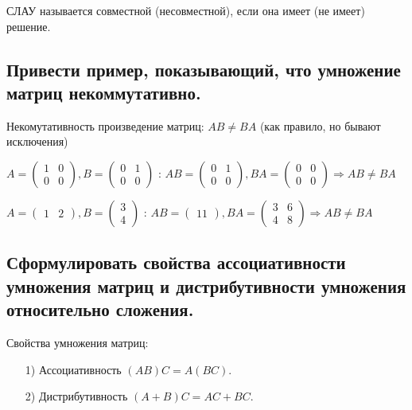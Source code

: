 СЛАУ называется совместной (несовместной), если она имеет (не имеет) решение.

\subsection{Привести пример, показывающий, что умножение матриц некоммутативно.}

Некомутативность произведение матриц: $AB\ne BA$ (как правило, но бывают исключения)

$A = \begin{pmatrix}1&0\\0&0\end{pmatrix}, 
           B = \begin{pmatrix}0&1\\0&0\end{pmatrix}$ :  $
           AB = \begin{pmatrix}0&1\\0&0\end{pmatrix},
           BA = \begin{pmatrix}0&0\\0&0\end{pmatrix}
           \Rightarrow AB \ne BA$
\vspace*{15pt}

$A = \begin{pmatrix}1&2\end{pmatrix}, 
           B = \begin{pmatrix}3\\4\end{pmatrix}$ :  $
           AB = \begin{pmatrix}11\end{pmatrix},
           BA = \begin{pmatrix}3&6\\4&8\end{pmatrix}
           \Rightarrow AB \ne BA$


\subsection{Сформулировать свойства ассоциативности умножения матриц и дистрибутивности умножения относительно сложения.}

\noindent
Свойства умножения матриц:
\begin{enumerate}
    \item[1)] Ассоциативность $(AB)C = A(BC)$.
    \item[2)] Дистрибутивность $(A + B)C = AC + BC$.
\end{enumerate}

